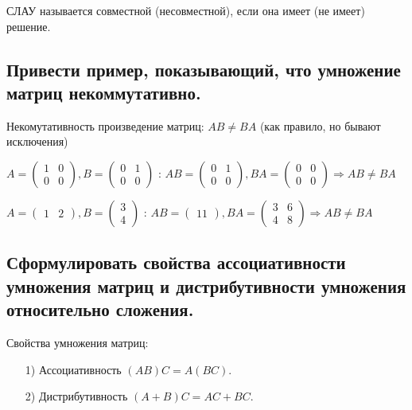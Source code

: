 СЛАУ называется совместной (несовместной), если она имеет (не имеет) решение.

\subsection{Привести пример, показывающий, что умножение матриц некоммутативно.}

Некомутативность произведение матриц: $AB\ne BA$ (как правило, но бывают исключения)

$A = \begin{pmatrix}1&0\\0&0\end{pmatrix}, 
           B = \begin{pmatrix}0&1\\0&0\end{pmatrix}$ :  $
           AB = \begin{pmatrix}0&1\\0&0\end{pmatrix},
           BA = \begin{pmatrix}0&0\\0&0\end{pmatrix}
           \Rightarrow AB \ne BA$
\vspace*{15pt}

$A = \begin{pmatrix}1&2\end{pmatrix}, 
           B = \begin{pmatrix}3\\4\end{pmatrix}$ :  $
           AB = \begin{pmatrix}11\end{pmatrix},
           BA = \begin{pmatrix}3&6\\4&8\end{pmatrix}
           \Rightarrow AB \ne BA$


\subsection{Сформулировать свойства ассоциативности умножения матриц и дистрибутивности умножения относительно сложения.}

\noindent
Свойства умножения матриц:
\begin{enumerate}
    \item[1)] Ассоциативность $(AB)C = A(BC)$.
    \item[2)] Дистрибутивность $(A + B)C = AC + BC$.
\end{enumerate}

